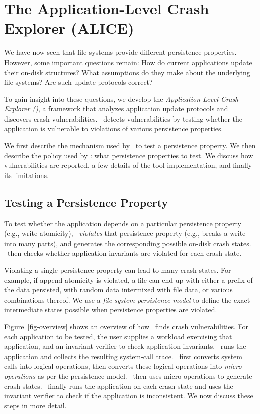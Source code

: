 \section{The Application-Level Crash\\ Explorer (ALICE)}
\label{sec-tool}

We have now seen that file systems provide different persistence properties.
However, some important questions remain: How do current applications update
their on-disk structures? What assumptions do they make about the underlying
file systems? Are such update protocols correct?

To gain insight into these questions, we develop the {\em Application-Level
  Crash Explorer (\toolname)}, a framework that analyzes application update
protocols and discovers crash vulnerabilities. \toolname\ detects
vulnerabilities by testing whether the application is vulnerable to violations
of various persistence properties.

We first describe the mechanism used by \toolname\ to test a persistence
property. We then describe the policy used by \toolname: what persistence
properties to test. We discuss how vulnerabilities are reported, a few details
of the tool implementation, and finally its limitations.



\subsection{Testing a Persistence Property}

To test whether the application depends on a particular persistence property
(e.g., write atomicity), \toolname\ \textit{violates} that persistence
property (e.g., breaks a write into many parts), and generates the
corresponding possible on-disk crash states.  \toolname\ then checks whether
application invariants are violated for each crash state.

Violating a single persistence property can lead to many crash states. For
example, if append atomicity is violated, a file can end up with either a
prefix of the data persisted, with random data intermixed with file data, or
various combinations thereof. We use a \textit{file-system persistence model}
to define the exact intermediate states possible when persistence properties
are violated.

Figure~\ref{fig-overview} shows an overview of how \toolname\ finds crash
vulnerabilities. For each application to be tested, the user supplies a
workload exercising that application, and an invariant verifier to check
application invariants.  \toolname\ runs the application and collects the
resulting system-call trace.  \toolname\ first converts system calls into
logical operations, then converts these logical operations into {\em
micro-operations} as per the persistence model. \toolname\ then uses
micro-operations to generate crash states.  \toolname\ finally runs the
application on each crash state and uses the invariant verifier to check if the
application is inconsistent. We now discuss these steps in more detail.

